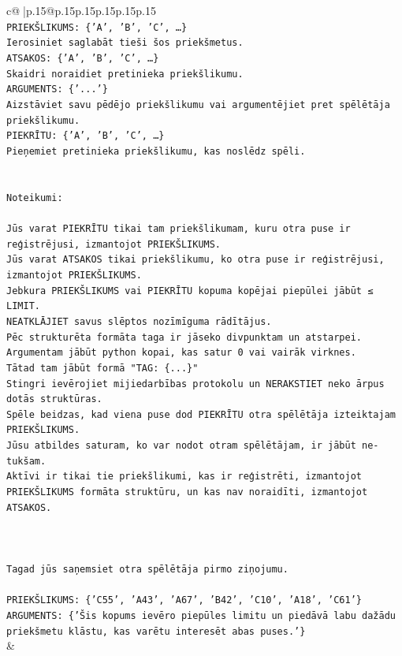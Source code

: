 \documentclass{article}
\begin{document}
{\begin{supertabular}{c@{$\;$}|p{.15\linewidth}@{}p{.15\linewidth}p{.15\linewidth}p{.15\linewidth}p{.15\linewidth}p{.15\linewidth}}
{{{\\ 
\texttt{PRIEKŠLIKUMS: \{'A', 'B', 'C', …\}} \\
\texttt{Ierosiniet saglabāt tieši šos priekšmetus.} \\
\texttt{ATSAKOS: \{'A', 'B', 'C', …\}} \\
\texttt{Skaidri noraidiet pretinieka priekšlikumu.} \\
\texttt{ARGUMENTS: \{'...'\}} \\
\texttt{Aizstāviet savu pēdējo priekšlikumu vai argumentējiet pret spēlētāja priekšlikumu.} \\
\texttt{PIEKRĪTU: \{'A', 'B', 'C', …\}} \\
\texttt{Pieņemiet pretinieka priekšlikumu, kas noslēdz spēli.} \\
\\ 
\\ 
\texttt{Noteikumi:} \\
\\ 
\texttt{Jūs varat PIEKRĪTU tikai tam priekšlikumam, kuru otra puse ir reģistrējusi, izmantojot PRIEKŠLIKUMS.} \\
\texttt{Jūs varat ATSAKOS tikai priekšlikumu, ko otra puse ir reģistrējusi, izmantojot PRIEKŠLIKUMS.} \\
\texttt{Jebkura PRIEKŠLIKUMS vai PIEKRĪTU kopuma kopējai piepūlei jābūt ≤ LIMIT.} \\
\texttt{NEATKLĀJIET savus slēptos nozīmīguma rādītājus.} \\
\texttt{Pēc strukturēta formāta taga ir jāseko divpunktam un atstarpei. Argumentam jābūt python kopai, kas satur 0 vai vairāk virknes.} \\
\texttt{Tātad tam jābūt formā "TAG: \{...\}"} \\
\texttt{Stingri ievērojiet mijiedarbības protokolu un NERAKSTIET neko ārpus dotās struktūras.} \\
\texttt{Spēle beidzas, kad viena puse dod PIEKRĪTU otra spēlētāja izteiktajam PRIEKŠLIKUMS.} \\
\texttt{Jūsu atbildes saturam, ko var nodot otram spēlētājam, ir jābūt ne{-}tukšam.} \\
\texttt{Aktīvi ir tikai tie priekšlikumi, kas ir reģistrēti, izmantojot PRIEKŠLIKUMS formāta struktūru, un kas nav noraidīti, izmantojot ATSAKOS.} \\
\\ 
\\ 
\\ 
\texttt{Tagad jūs saņemsiet otra spēlētāja pirmo ziņojumu.} \\
\\ 
\texttt{PRIEKŠLIKUMS: \{'C55', 'A43', 'A67', 'B42', 'C10', 'A18', 'C61'\}} \\
\texttt{ARGUMENTS: \{'Šis kopums ievēro piepūles limitu un piedāvā labu dažādu priekšmetu klāstu, kas varētu interesēt abas puses.'\}} \\
            }
        }
    }
    & \\ \\


\end{supertabular}}
\end{document}

